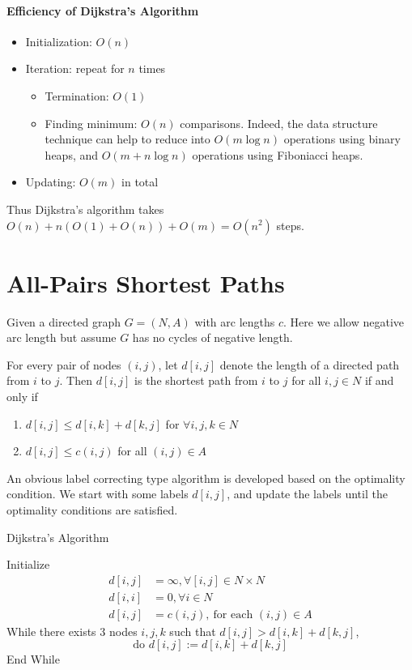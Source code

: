 \paragraph{Efficiency of Dijkstra's Algorithm}
\begin{itemize}
\item
Initialization: $O(n)$
\item
Iteration: repeat for $n$ times
\begin{itemize}
\item
Termination: $O(1)$
\item
Finding minimum: $O(n)$ comparisons. Indeed, the data structure technique can help to reduce into $O(m\log n)$ operations using binary heaps, and $O(m+n\log n)$ operations using Fiboniacci heaps.
\end{itemize}
\item
Updating: $O(m)$ in total
\end{itemize}
Thus Dijkstra’s algorithm takes $O(n)+n(O(1)+O(n))+O(m)=O(n^2)$ steps.


\section{All-Pairs Shortest Paths}
Given a directed graph $G=(N,A)$ with arc lengths $c$. Here we allow negative arc length but assume $G$ has no cycles of negative length.

\begin{theorem}
For every pair of nodes $(i,j)$, let $d[i,j]$ denote the length of a directed path from $i$ to $j$.
Then $d[i,j]$ is the shortest path from $i$ to $j$ for all $i,j\in N$ if and only if
\begin{enumerate}
\item
$d[i,j]\le d[i,k]+d[k,j]$ for $\forall i,j,k\in N$
\item
$d[i,j]\le c(i,j)$ for all $(i,j)\in A$
\end{enumerate}
\end{theorem}

An obvious label correcting type algorithm is developed based on the optimality condition.
We start with some labels $d[i,j]$, and update the labels until the optimality conditions are satisfied.
\begin{algorithm}[htb] 
\caption{Dijkstra's Algorithm} 
\label{alg:SM} 
\begin{algorithmic}[1] %
\STATE 
Initialize 
\begin{align*}
d[i,j]&=\infty,\forall[i,j]\in N\times N\\
d[i,i]&=0,\forall i\in N\\
d[i,j]&=c(i,j),\ \text{for each $(i,j)\in A$}
\end{align*}
\STATE
While there exists 3 nodes $i,j,k$ such that $d[i,j]>d[i,k]+d[k,j]$,
\[
\text{do }d[i,j]:=d[i,k]+d[k,j]
\]
End While
\end{algorithmic}
\end{algorithm}



